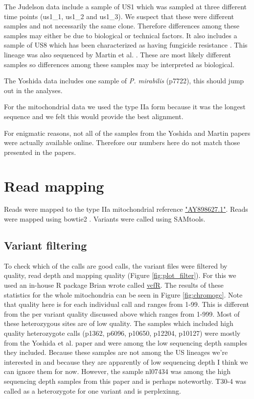 \documentclass{article}\usepackage[]{graphicx}\usepackage[]{color}
\begin{document}
The Judelson data include a sample of US1 which was sampled at three different time points (us1\_1, us1\_2 and us1\_3).  We suspect that these were different samples and not necessarily the same clone.  Therefore differences among these samples may either be due to biological or technical factors.  It also includes a sample of US8 which has been characterized as having fungicide resistance \cite{danies2013phenotypic}.  This lineage was also sequenced by Martin et al. \cite{martin2013reconstructing}.  These are most likely different samples so differences among these samples may be interpreted as biological.

The Yoshida data includes one sample of \emph{P. mirabilis} (p7722), this should jump out in the analyses.

For the mitochondrial data we used the type IIa form \cite{avila2006mitochondrial} because it was the longest sequence and we felt this would provide the best alignment.

For enigmatic reasons, not all of the samples from the Yoshida and Martin papers were actually available online.  Therefore our numbers here do not match those presented in the papers.



\section{Read mapping}

Reads were mapped to the type IIa mitochondrial reference \href{http://www.ncbi.nlm.nih.gov/nuccore/AY898627.1}{"AY898627.1"}.  Reads were mapped using bowtie2 \cite{langmead2012fast}.  Variants were called using SAMtools\cite{li2009sequence}.

\subsection{Variant filtering}
To check which of the calls are good calls, the variant files were filtered by quality, read depth and mapping quality (Figure \ref{fig:plot_filter}). For this we used an in-house R package Brian wrote called \href{https://github.com/knausb/vcfR}{vcfR}. The results of these statistics for the whole mitochondria can be seen in Figure \ref{fig:chromogc}. Note that quality here is for each individual call and ranges from 1-99.  This is different from the per variant quality discussed above which ranges from 1-999.  Most of these heterozygous sites are of low quality.
The samples which included high quality heterozygote calls (p1362, p6096, p10650, p12204, p10127) were mostly from the Yoshida et al. \cite{yoshida2013correction} paper and were among the low sequencing depth samples they included.  Because these samples are not among the US lineages we're interested in and because they are apparently of low sequencing depth I think we can ignore them for now.  However, the sample nl07434 was among the high sequencing depth samples from this paper and is perhaps noteworthy.  T30-4 was called as a heterozygote for one variant and is perplexinng.
\end{document}
